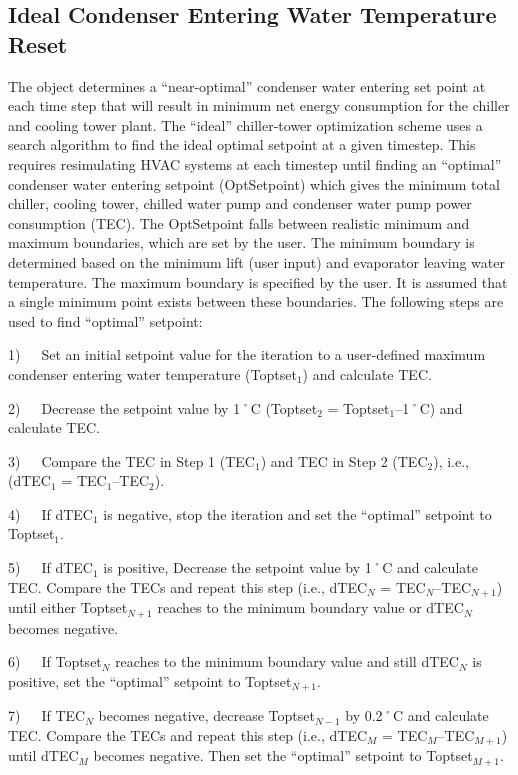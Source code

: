\subsection{Ideal Condenser Entering Water Temperature Reset}\label{ideal-condenser-entering-water-temperature-reset}

The object determines a ``near-optimal'' condenser water entering set point at each time step that will result in minimum net energy consumption for the chiller and cooling tower plant. The ``ideal'' chiller-tower optimization scheme uses a search algorithm to find the ideal optimal setpoint at a given timestep. This requires resimulating HVAC systems at each timestep until finding an ``optimal'' condenser water entering setpoint (OptSetpoint) which gives the minimum total chiller, cooling tower, chilled water pump and condenser water pump power consumption (TEC). The OptSetpoint falls between realistic minimum and maximum boundaries, which are set by the user. The minimum boundary is determined based on the minimum lift (user input) and evaporator leaving water temperature. The maximum boundary is specified by the user. It is assumed that a single minimum point exists between these boundaries. The following steps are used to find ``optimal'' setpoint:

1)~~~Set an initial setpoint value for the iteration to a user-defined maximum condenser entering water temperature (Toptset\(_{1}\)) and calculate TEC.

2)~~~Decrease the setpoint value by 1˚C (Toptset\(_{2}\) = Toptset\(_{1}\)--1˚C) and calculate TEC.

3)~~~Compare the TEC in Step 1 (TEC\(_{1}\)) and TEC in Step 2 (TEC\(_{2}\)), i.e., (dTEC\(_{1}\) = TEC\(_{1}\)--TEC\(_{2}\)).

4)~~~If dTEC\(_{1}\) is negative, stop the iteration and set the ``optimal'' setpoint to Toptset\(_{1}\).

5)~~~If dTEC\(_{1}\) is positive, Decrease the setpoint value by 1˚C and calculate TEC. Compare the TECs and repeat this step (i.e., dTEC\(_{N}\) = TEC\(_{N}\)--TEC\(_{N+1}\)) until either Toptset\(_{N+1}\) reaches to the minimum boundary value or dTEC\(_{N}\) becomes negative.

6)~~~If Toptset\(_{N}\) reaches to the minimum boundary value and still dTEC\(_{N}\) is positive, set the ``optimal'' setpoint to Toptset\(_{N+1}\).

7)~~~If TEC\(_{N}\) becomes negative, decrease Toptset\(_{N-1}\) by 0.2˚C and calculate TEC. Compare the TECs and repeat this step (i.e., dTEC\(_{M}\) = TEC\(_{M}\)--TEC\(_{M+1}\)) until dTEC\(_{M}\) becomes negative. Then set the ``optimal'' setpoint to Toptset\(_{M+1}\).

